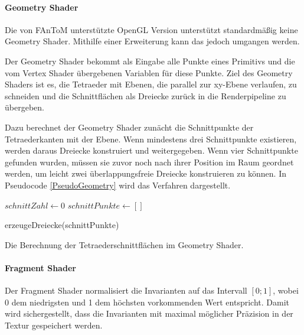 \documentclass[a4paper,fontsize=12pt,toc=bib,halfparskip]{scrartcl}
\begin{document}
\paragraph{Geometry Shader}
Die von FAnToM unterst\"utzte OpenGL Version unterst\"utzt standardm\"a{\ss}ig keine Geometry Shader. Mithilfe einer Erweiterung kann das jedoch umgangen werden.

Der Geometry Shader bekommt als Eingabe alle Punkte eines Primitivs und die vom Vertex Shader \"ubergebenen Variablen f\"ur diese Punkte. Ziel des Geometry Shaders ist es, die Tetraeder mit Ebenen, die parallel zur xy-Ebene verlaufen, zu schneiden und die Schnittfl\"achen als Dreiecke zur\"uck in die Renderpipeline zu \"ubergeben.

Dazu berechnet der Geometry Shader zun\"acht die Schnittpunkte der Tetraederkanten mit der Ebene. Wenn mindestens drei Schnittpunkte existieren, werden  daraus Dreiecke konstruiert und weitergegeben. Wenn vier Schnittpunkte gefunden wurden, m\"ussen sie zuvor noch nach ihrer Position im Raum geordnet werden, um leicht zwei \"uberlappungsfreie Dreiecke konstruieren zu k\"onnen. In Pseudocode \ref{PseudoGeometry} wird das Verfahren dargestellt.

\begin{algorithm}
	$schnittZahl \gets 0$\;
	$schnittPunkte \gets []$\;
	
	erzeugeDreiecke(schnittPunkte)\;
	\vspace{0.5cm}
	\caption{Die Berechnung der Tetraederschnittfl\"achen im Geometry Shader.}
	\label{PseudoGeometry}
\end{algorithm}

\paragraph{Fragment Shader}
Der Fragment Shader normalisiert die Invarianten auf das Intervall $[0;1]$, wobei 0 dem niedrigsten und 1 dem h\"ochsten vorkommenden Wert entspricht. Damit wird sichergestellt, dass die Invarianten mit maximal m\"oglicher Pr\"azision in der Textur gespeichert werden.
\end{document}
